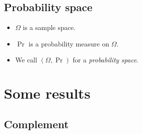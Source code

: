 \subsection{Probability space}

\begin{frame}
  \begin{definition}
    \begin{itemize}
      \item \(\Omega\) is a sample space.
      \item \(\Pr\) is a probability measure on \(\Omega\).

        \pause{}

      \item We call \((\Omega, \Pr)\) for a \emph{probability space}.
    \end{itemize}
  \end{definition}
\end{frame}

\section{Some results}

\subsection{Complement}

